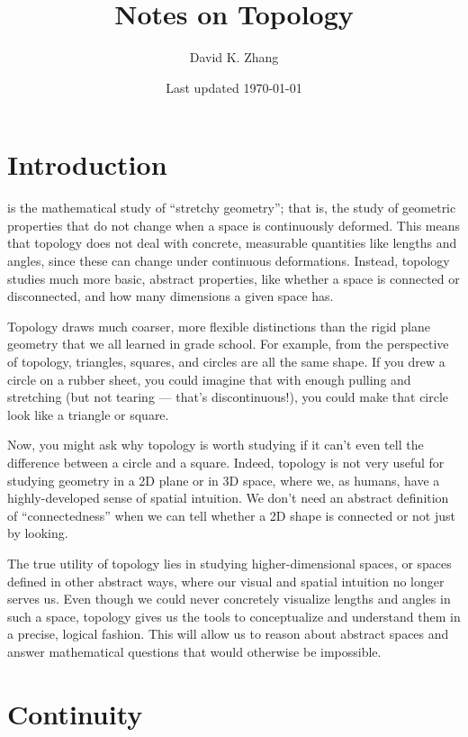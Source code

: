 \documentclass[12pt]{article}
\title{Notes on Topology}
\author{David K. Zhang}
\date{Last updated \today}
\begin{document}
\maketitle

\section{Introduction}

 is the mathematical study of ``stretchy geometry''; that is, the study of geometric properties that do not change when a space is continuously deformed. This means that topology does not deal with concrete, measurable quantities like lengths and angles, since these can change under continuous deformations. Instead, topology studies much more basic, abstract properties, like whether a space is connected or disconnected, and how many dimensions a given space has.

Topology draws much coarser, more flexible distinctions than the rigid plane geometry that we all learned in grade school. For example, from the perspective of topology, triangles, squares, and circles are all the same shape. If you drew a circle on a rubber sheet, you could imagine that with enough pulling and stretching (but not tearing --- that's discontinuous!), you could make that circle look like a triangle or square.

Now, you might ask why topology is worth studying if it can't even tell the difference between a circle and a square. Indeed, topology is not very useful for studying geometry in a 2D plane or in 3D space, where we, as humans, have a highly-developed sense of spatial intuition. We don't need an abstract definition of ``connectedness'' when we can tell whether a 2D shape is connected or not just by looking.

The true utility of topology lies in studying higher-dimensional spaces, or spaces defined in other abstract ways, where our visual and spatial intuition no longer serves us. Even though we could never concretely visualize lengths and angles in such a space, topology gives us the tools to conceptualize and understand them in a precise, logical fashion. This will allow us to reason about abstract spaces and answer mathematical questions that would otherwise be impossible.

\section{Continuity}
\end{document}

